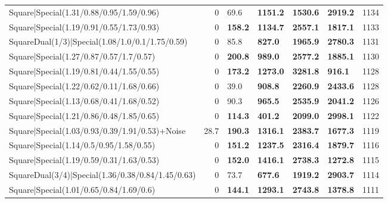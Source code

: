 \begin{tabular}{lrllllr}
 Square|Special(1.31/0.88/0.95/1.59/0.96)                      &             0   & 69.6           & \textbf{1151.2} & \textbf{1530.6} & \textbf{2919.2} &         1134 \\
 Square|Special(1.19/0.91/0.55/1.73/0.93)                      &             0   & \textbf{158.2} & \textbf{1134.7} & \textbf{2557.1} & \textbf{1817.1} &         1133 \\
 SquareDual(1/3)|Special(1.08/1.0/0.1/1.75/0.59)               &             0   & 85.8           & \textbf{827.0}  & \textbf{1965.9} & \textbf{2780.3} &         1131 \\
 Square|Special(1.27/0.87/0.57/1.7/0.57)                       &             0   & \textbf{200.8} & \textbf{989.0}  & \textbf{2577.2} & \textbf{1885.1} &         1130 \\
 Square|Special(1.19/0.81/0.44/1.55/0.55)                      &             0   & \textbf{173.2} & \textbf{1273.0} & \textbf{3281.8} & \textbf{916.1}  &         1128 \\
 Square|Special(1.22/0.62/0.11/1.68/0.66)                      &             0   & 39.0           & \textbf{908.8}  & \textbf{2260.9} & \textbf{2433.6} &         1128 \\
 Square|Special(1.13/0.68/0.41/1.68/0.52)                      &             0   & 90.3           & \textbf{965.5}  & \textbf{2535.9} & \textbf{2041.2} &         1126 \\
 Square|Special(1.21/0.86/0.48/1.85/0.65)                      &             0   & \textbf{114.3} & \textbf{401.2}  & \textbf{2099.0} & \textbf{2998.1} &         1122 \\
 Square|Special(1.03/0.93/0.39/1.91/0.53)+Noise                &            28.7 & \textbf{190.3} & \textbf{1316.1} & \textbf{2383.7} & \textbf{1677.3} &         1119 \\
 Square|Special(1.14/0.5/0.95/1.58/0.55)                       &             0   & \textbf{151.2} & \textbf{1237.5} & \textbf{2316.4} & \textbf{1879.7} &         1116 \\
 Square|Special(1.19/0.59/0.31/1.63/0.53)                      &             0   & \textbf{152.0} & \textbf{1416.1} & \textbf{2738.3} & \textbf{1272.8} &         1115 \\
 SquareDual(3/4)|Special(1.36/0.38/0.84/1.45/0.63)             &             0   & 73.7           & \textbf{677.6}  & \textbf{1919.2} & \textbf{2903.7} &         1114 \\
 Square|Special(1.01/0.65/0.84/1.69/0.6)                       &             0   & \textbf{144.1} & \textbf{1293.1} & \textbf{2743.8} & \textbf{1378.8} &         1111 \\

\end{tabular}
